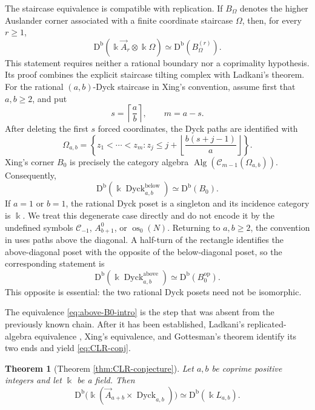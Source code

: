 \documentclass[12pt,a4paper,english,reqno]{amsart}
\theoremstyle{plain}
\newtheorem{theorem}{Theorem}[section]
\theoremstyle{definition}
\newcommand{\kk}{\Bbbk}
\newcommand{\Db}{\mathrm D^{\mathrm b}}
\newcommand{\Dyck}{\operatorname{Dyck}}
\newcommand{\op}{\mathrm{op}}
\newcommand{\C}{\mathcal C}
\begin{document}
The staircase equivalence is compatible with replication.  If
$B_\Omega$ denotes the higher Auslander corner associated with a finite
coordinate staircase $\Omega$, then, for every $r\geq1$,
\begin{equation}
 \Db\!\left(\kk\vec A_r\otimes\kk\Omega\right)
 \simeq
 \Db\!\left(B_\Omega^{(r)}\right).
\label{eq:intro-replicated-staircase}
\end{equation}
This statement requires neither a rational boundary nor a coprimality
hypothesis.  Its proof combines the explicit staircase tilting complex with
Ladkani's theorem.  For the rational $(a,b)$-Dyck staircase in Xing's
convention, assume first that $a,b\geq2$, and put
\[
 s=\left\lceil\frac ab\right\rceil,\qquad m=a-s.
\]
After deleting the first $s$ forced coordinates, the Dyck paths are
identified with
\[
 \Omega_{a,b}=
 \left\{z_1<\cdots<z_m:
 z_j\leq j+\left\lfloor\frac{b(s+j-1)}a\right\rfloor
 \right\}.
\]
Xing's corner $B_0$ is precisely the category algebra
$\operatorname{Alg}(\C_{m-1}(\Omega_{a,b}))$. Consequently,
\begin{equation}
 \Db(\kk\Dyck^{\mathrm{below}}_{a,b})
 \simeq\Db(B_0).
\label{eq:dyck-B0-intro}
\end{equation}
If $a=1$ or $b=1$, the rational Dyck poset is a singleton and its
incidence category is $\kk$.  We treat this degenerate case directly
and do not encode it by the undefined symbols
$\C_{-1}$, $A_{b+1}^{0}$, or $\operatorname{os}_0(N)$.
Returning to $a,b\ge 2$, the convention in \cite{CLR} uses paths above the
diagonal.  A half-turn of
the rectangle identifies the above-diagonal poset with the opposite of the
below-diagonal poset, so the corresponding statement is
\begin{equation}
 \Db(\kk\Dyck^{\mathrm{above}}_{a,b})
 \simeq\Db(B_0^{\op}).
\label{eq:above-B0-intro}
\end{equation}
This opposite is essential: the two rational Dyck posets need not be
isomorphic.

The equivalence \eqref{eq:above-B0-intro} is the step that was absent from the
previously known chain.  After it has been established, Ladkani's
replicated-algebra equivalence \cite[Corollary~1.3]{Ladkani}, Xing's
equivalence, and Gottesman's theorem identify its two ends and yield
\eqref{eq:CLR-conj}.

\begin{theorem}[Theorem \ref{thm:CLR-conjecture}]
\label{thm:intro-conjecture}
Let $a,b$ be coprime positive integers and let $\kk$ be a field.
Then
\[
 \Db\!\bigl(\kk(\vec A_{a+b}\times\Dyck_{a,b})\bigr)
 \simeq \Db(\kk L_{a,b}).
\]
\end{theorem}
\end{document}
